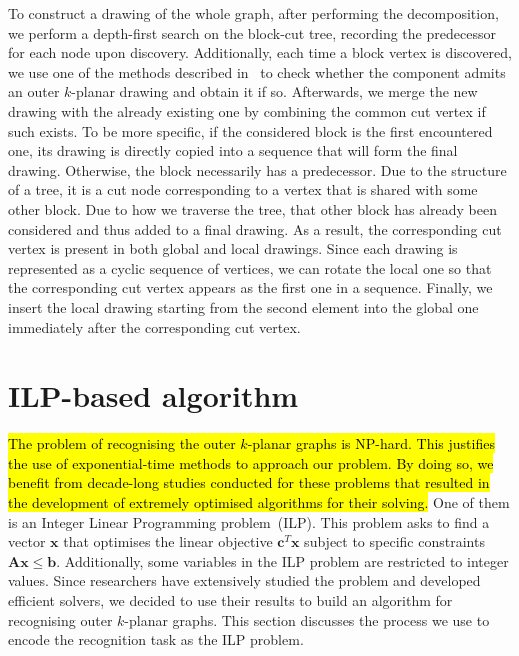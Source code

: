To construct a drawing of the whole graph, after performing the decomposition, we perform a depth-first search on the block-cut tree, recording the predecessor for each node upon discovery. Additionally, each time a block vertex is discovered, we use one of the methods described in~ to check whether the component admits an outer \(k\)-planar drawing and obtain it if so. Afterwards, we merge the new drawing with the already existing one by combining the common cut vertex if such exists. To be more specific, if the considered block is the first encountered one, its drawing is directly copied into a sequence that will form the final drawing. Otherwise, the block necessarily has a predecessor. Due to the structure of a tree, it is a cut node corresponding to a vertex that is shared with some other block. Due to how we traverse the tree, that other block has already been considered and thus added to a final drawing. As a result, the corresponding cut vertex is present in both global and local drawings. Since each drawing is represented as a cyclic sequence of vertices, we can rotate the local one so that the corresponding cut vertex appears as the first one in a sequence. Finally, we insert the local drawing starting from the second element into the global one immediately after the corresponding cut vertex.


\section{ILP-based algorithm}\label{sec:ILP-def}

\hl{The problem of recognising the outer {\(k\)}-planar graphs is NP-hard. This justifies the use of exponential-time methods to approach our problem. By doing so, we benefit from decade-long studies conducted for these problems that resulted in the development of extremely optimised algorithms for their solving.} One of them is an Integer Linear Programming problem~(ILP). This problem asks to find a vector \(\mathbf{x}\) that optimises the linear objective \(\mathbf{c}^T\mathbf{x}\) subject to specific constraints \(\mathbf{Ax}\leqslant\mathbf{b}\). Additionally, some variables in the ILP problem are restricted to integer values. Since researchers have extensively studied the problem and developed efficient solvers, we decided to use their results to build an algorithm for recognising outer \(k\)-planar graphs. This section discusses the process we use to encode the recognition task as the ILP problem.

